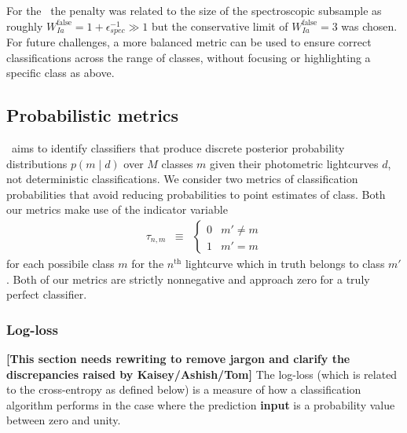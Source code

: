 For the \snphotcc\ the penalty was related to the size of the spectroscopic subsample as roughly $W_{Ia}^\mathrm{false} = 1 + \epsilon_{spec}^{-1} \gg 1$ but the conservative limit of $W_{Ia}^\mathrm{false} = 3$ was chosen.
For future challenges, a more balanced metric can be used to ensure correct classifications across the range of classes, without focusing or highlighting a specific class as above.



\subsection{Probabilistic metrics}
\label{sec:probabilistic}

\plasticc\ aims to identify classifiers that produce discrete posterior probability distributions $p(m \mid d)$ over $M$ classes $m$ given their photometric lightcurves $d$, not deterministic classifications.
We consider two metrics of classification probabilities that avoid reducing probabilities to point estimates of class.
Both our metrics make use of the indicator variable
\begin{eqnarray}
  \label{eq:indicator}
  \tau_{n, m} &\equiv& \begin{cases}
  0 & m' \neq m\\
  1 & m' = m
  \end{cases}
\end{eqnarray}
for each possibile class $m$ for the $n^{\mathrm{th}}$ lightcurve which in truth belongs to class $m'$.
Both of our metrics are strictly nonnegative and approach zero for a truly perfect classifier.

\subsubsection{Log-loss}
\label{sec:logloss}

\textbf{[This section needs rewriting to remove jargon and clarify the discrepancies raised by Kaisey/Ashish/Tom]}
The log-loss (which is related to the cross-entropy as defined below) is a measure of how a classification algorithm performs in the case where the prediction \textbf{input} is a probability value between zero and unity.

